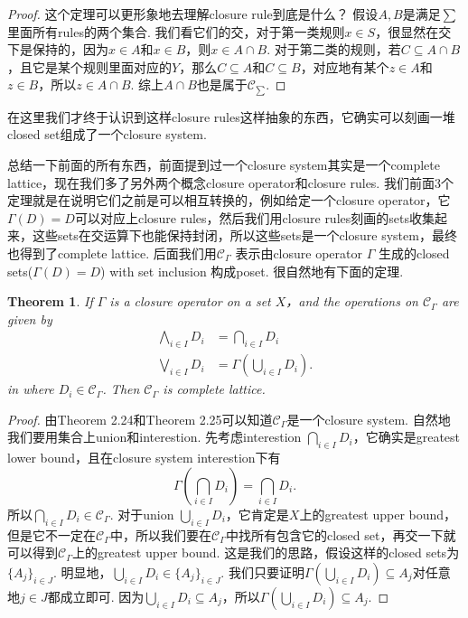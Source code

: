 \documentclass{article}
\newtheorem{theorem}{Theorem}[section]
\begin{document}
\begin{proof}
这个定理可以更形象地去理解closure rule到底是什么？ 假设$A,B$是满足$\sum$里面所有rules的两个集合. 我们看它们的交，对于第一类规则$x \in S$，很显然在交下是保持的，因为$x \in A$和$x \in B$，则$x \in A \cap B$. 对于第二类的规则，若$C \subseteq A \cap B$，且它是某个规则里面对应的$Y$，那么$C \subseteq A$和$C \subseteq B$，对应地有某个$z \in A$和$z \in B$，所以$z \in A\cap B$. 综上$A \cap B$也是属于$\mathcal{C}_{\sum}$.
\end{proof}

{\color{blue} 在这里我们才终于认识到这样closure rules这样抽象的东西，它确实可以刻画一堆closed set组成了一个closure system}.

{\color{red} 总结一下前面的所有东西，前面提到过一个closure system其实是一个complete lattice，现在我们多了另外两个概念closure operator和closure rules. 我们前面3个定理就是在说明它们之前是可以相互转换的，例如给定一个closure operator，它$\Gamma(D) = D$可以对应上closure rules，然后我们用closure rules刻画的sets收集起来，这些sets在交运算下也能保持封闭，所以这些sets是一个closure system，最终也得到了complete lattice}. {\color{blue} 后面我们用$\mathcal{C}_\Gamma$ 表示由closure operator $\Gamma$ 生成的closed sets($\Gamma(D)=D$) with set inclusion 构成poset}. 很自然地有下面的定理.

\begin{theorem}
\rm If $\Gamma$ is a closure operator on a set $X$，and {\color{red} the operations on $\mathcal{C}_\Gamma$} are given by 
$$
\begin{aligned}
\bigwedge\limits_{i \in I} D_i &= \bigcap\limits_{i \in I} D_i \\
\bigvee\limits_{i \in I} D_i &= \Gamma(\bigcup\limits_{i \in I} D_i).
\end{aligned}
$$
in where $D_i \in \mathcal{C}_{\Gamma}$. Then $\mathcal{C}_\Gamma$ is complete lattice.
\end{theorem}

\begin{proof}
由Theorem 2.24和Theorem 2.25可以知道$\mathcal{C}_{\Gamma}$是一个closure system. 自然地我们要用集合上union和interestion. 先考虑interestion $\bigcap\limits_{i \in I} D_i$，它确实是greatest lower bound，且在closure system interestion下有
$$
\Gamma(\bigcap\limits_{i \in I} D_i) = \bigcap\limits_{i \in I} D_i.
$$
所以$\bigcap\limits_{i \in I} D_i \in \mathcal{C}_{\Gamma}$. 对于union $\bigcup\limits_{i \in I} D_i$，它肯定是$X$上的greatest upper bound，但是它不一定在$\mathcal{C}_{\Gamma}$中，所以我们要在$\mathcal{C}_{\Gamma}$中找所有包含它的closed set，再交一下就可以得到$\mathcal{C}_{\Gamma}$上的greatest upper bound. 这是我们的思路，假设这样的closed sets为$\{A_j\}_{i \in J}$. 明显地，$\bigcup\limits_{i \in I} D_i \in \{A_j\}_{i \in J}$. 我们只要证明$\Gamma(\bigcup\limits_{i \in I} D_i) \subseteq A_j$对任意地$j \in J$都成立即可. 因为$\bigcup\limits_{i \in I} D_i \subseteq A_j$，所以$\Gamma(\bigcup\limits_{i \in I} D_i) \subseteq A_j$. 
\end{proof}
\end{document}
